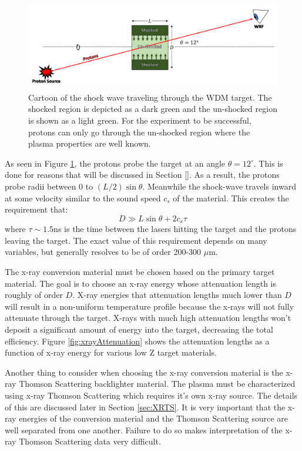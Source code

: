 \begin{figure}[!h]
    \centering
    \includegraphics[scale=0.7]{Figures/WDM_shock_cartoon.pdf}
    \caption[WDM Target Shock Wave Timing Cartoon]{Cartoon of the shock wave traveling through the WDM target. The shocked region is depicted as a dark green and the un-shocked region is shown as a light green. For the experiment to be successful, protons can only go through the un-shocked region where the plasma properties are well known. }
    \label{fig:WDM_shock_cartoon}
\end{figure}

As seen in Figure \ref{fig:WDM_shock_cartoon}, the protons probe the target at an angle $\theta=12^{\circ}$. This is done for reasons that will be discussed in Section \ref{}. As a result, the protons probe radii between 0 to $(L/2)\sin\theta$. Meanwhile the shock-wave travels inward at some velocity similar to the sound speed $c_s$ of the material. This creates the requirement that:
%
\begin{equation}
    D \gg L \sin \theta + 2c_s \tau 
\end{equation}
%
where $\tau\sim 1.5$ns is the time between the lasers hitting the target and the protons leaving the target. The exact value of this requirement depends on many variables, but generally resolves to be of order 200-300 $\mu$m. 

The x-ray conversion material must be chosen based on the primary target material. The goal is to choose an x-ray energy whose attenuation length is roughly of order $D$. X-ray energies that attenuation lengths much lower than $D$ will result in a non-uniform temperature profile because the x-rays will not fully attenuate through the target. X-rays with much high attenuation lengths won't deposit a significant amount of energy into the target, decreasing the total efficiency. Figure \ref{fig:xrayAttenuation} shows the attenuation lengths as a function of x-ray energy for various low Z target materials.

Another thing to consider when choosing the x-ray conversion material is the x-ray Thomson Scattering backlighter material. The plasma must be characterized using x-ray Thomson Scattering which requires it's own x-ray source. The details of this are discussed later in Section \ref{sec:XRTS}. It is very important that the x-ray energies of the conversion material and the Thomson Scattering source are well separated from one another. Failure to do so makes interpretation of the x-ray Thomson Scattering data very difficult.


